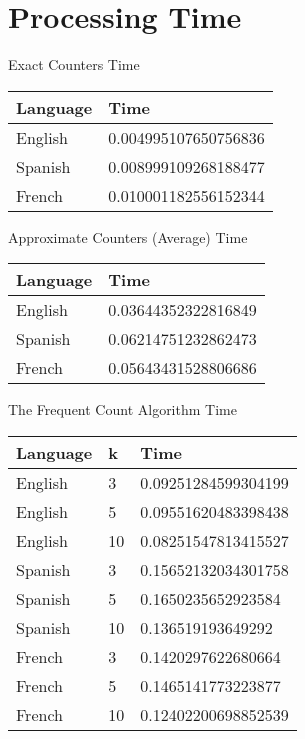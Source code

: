 \documentclass[]{revdetua}
\begin{document}
\section{Processing Time}

\begin{table}[!ht]
    \centering
    Exact Counters Time
    \begin{tabular}{|l|l|}
    \hline
        Language & Time \\ \hline
        English & 0.004995107650756836 \\ \hline
        Spanish & 0.008999109268188477 \\ \hline
        French & 0.010001182556152344 \\ \hline
    \end{tabular}
\end{table}

\begin{table}[!ht]
    \centering
    Approximate Counters (Average) Time
    \begin{tabular}{|l|l|}
     \hline
        Language & Time \\ \hline
        English & 0.03644352322816849 \\ \hline
        Spanish & 0.06214751232862473 \\ \hline
        French & 0.05643431528806686 \\ \hline
    \end{tabular}
\end{table}

\begin{table}[!ht]
    \centering
    The Frequent Count Algorithm Time
    \begin{tabular}{|l|l|l|}
    \hline
        Language & k & Time \\ \hline
        English & 3 & 0.09251284599304199 \\ \hline
        English & 5 & 0.09551620483398438 \\ \hline
        English & 10 & 0.08251547813415527 \\ \hline
        Spanish & 3 & 0.15652132034301758 \\ \hline
        Spanish & 5 & 0.1650235652923584 \\ \hline
        Spanish & 10 & 0.136519193649292 \\ \hline
        French & 3 & 0.1420297622680664 \\ \hline
        French & 5 & 0.1465141773223877 \\ \hline
        French & 10 & 0.12402200698852539 \\ \hline
    \end{tabular}
\end{table}
\end{document}
